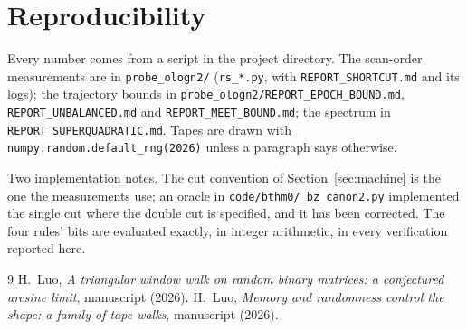 \documentclass[11pt]{article}
\begin{document}
\section{Reproducibility}\label{sec:repro}

Every number comes from a script in the project directory. The scan-order measurements are
in \texttt{probe\_ologn2/} (\texttt{rs\_*.py}, with \texttt{REPORT\_SHORTCUT.md} and its
logs); the trajectory bounds in \texttt{probe\_ologn2/REPORT\_EPOCH\_BOUND.md},
\texttt{REPORT\_UNBALANCED.md} and \texttt{REPORT\_MEET\_BOUND.md}; the spectrum in
\texttt{REPORT\_SUPERQUADRATIC.md}. Tapes are drawn with
\texttt{numpy.random.default\_rng(2026)} unless a paragraph says otherwise.

Two implementation notes. The cut convention of Section~\ref{sec:machine} is the one the
measurements use; an oracle in \texttt{code/bthm0/\_bz\_canon2.py} implemented the single
cut where the double cut is specified, and it has been corrected. The four rules' bits are
evaluated exactly, in integer arithmetic, in every verification reported here.


\begin{thebibliography}{9}
 H.~Luo, \emph{A triangular window walk on random binary
matrices: a conjectured arcsine limit}, manuscript (2026).
 H.~Luo, \emph{Memory and randomness control the shape: a
family of tape walks}, manuscript (2026).
\end{thebibliography}
\end{document}
